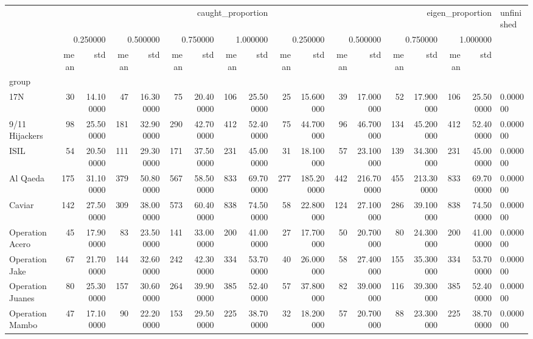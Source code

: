 \begin{tabular}{lrrrrrrrrrrrrrrrrl}
 & \multicolumn{8}{r}{caught_proportion} & \multicolumn{8}{r}{eigen_proportion} & unfinished \\
 & \multicolumn{2}{r}{0.250000} & \multicolumn{2}{r}{0.500000} & \multicolumn{2}{r}{0.750000} & \multicolumn{2}{r}{1.000000} & \multicolumn{2}{r}{0.250000} & \multicolumn{2}{r}{0.500000} & \multicolumn{2}{r}{0.750000} & \multicolumn{2}{r}{1.000000} &  \\
 & mean & std & mean & std & mean & std & mean & std & mean & std & mean & std & mean & std & mean & std &  \\
group &  &  &  &  &  &  &  &  &  &  &  &  &  &  &  &  &  \\
17N & 30 & 14.100000 & 47 & 16.300000 & 75 & 20.400000 & 106 & 25.500000 & 25 & 15.600000 & 39 & 17.000000 & 52 & 17.900000 & 106 & 25.500000 & 0.000000 \\
9/11 Hijackers & 98 & 25.500000 & 181 & 32.900000 & 290 & 42.700000 & 412 & 52.400000 & 75 & 44.700000 & 96 & 46.700000 & 134 & 45.200000 & 412 & 52.400000 & 0.000000 \\
ISIL & 54 & 20.500000 & 111 & 29.300000 & 171 & 37.500000 & 231 & 45.000000 & 31 & 18.100000 & 57 & 23.100000 & 139 & 34.300000 & 231 & 45.000000 & 0.000000 \\
Al Qaeda & 175 & 31.100000 & 379 & 50.800000 & 567 & 58.500000 & 833 & 69.700000 & 277 & 185.200000 & 442 & 216.700000 & 455 & 213.300000 & 833 & 69.700000 & 0.000000 \\
Caviar & 142 & 27.500000 & 309 & 38.000000 & 573 & 60.400000 & 838 & 74.500000 & 58 & 22.800000 & 124 & 27.100000 & 286 & 39.100000 & 838 & 74.500000 & 0.000000 \\
Operation Acero & 45 & 17.900000 & 83 & 23.500000 & 141 & 33.000000 & 200 & 41.000000 & 27 & 17.700000 & 50 & 20.700000 & 80 & 24.300000 & 200 & 41.000000 & 0.000000 \\
Operation Jake & 67 & 21.700000 & 144 & 32.600000 & 242 & 42.300000 & 334 & 53.700000 & 40 & 26.000000 & 58 & 27.400000 & 155 & 35.300000 & 334 & 53.700000 & 0.000000 \\
Operation Juanes & 80 & 25.300000 & 157 & 30.600000 & 264 & 39.900000 & 385 & 52.400000 & 57 & 37.800000 & 82 & 39.000000 & 116 & 39.300000 & 385 & 52.400000 & 0.000000 \\
Operation Mambo & 47 & 17.100000 & 90 & 22.200000 & 153 & 29.500000 & 225 & 38.700000 & 32 & 18.200000 & 57 & 20.700000 & 88 & 23.300000 & 225 & 38.700000 & 0.000000 \\

\end{tabular}
